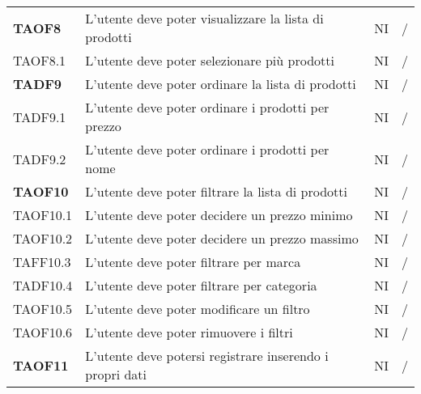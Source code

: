 \begin{center}
\begin{longtable}[!h]{p{60px} p{240px} p{35px} p{35px}}
        \textbf{TAOF8}  & L'utente deve poter visualizzare la lista di prodotti                                               & NI             & /              \\
        TAOF8.1         & L'utente deve poter selezionare più prodotti                                                        & NI             & /              \\
        \textbf{TADF9}  & L'utente deve poter ordinare la lista di prodotti                                                   & NI             & /              \\
        TADF9.1         & L'utente deve poter ordinare i prodotti per prezzo                                                  & NI             & /              \\
        TADF9.2         & L'utente deve poter ordinare i prodotti per nome                                                    & NI             & /              \\
        \textbf{TAOF10} & L'utente deve poter filtrare la lista di prodotti                                                   & NI             & /              \\
        TAOF10.1        & L'utente deve poter decidere un prezzo minimo                                                       & NI             & /              \\
        TAOF10.2        & L'utente deve poter decidere un prezzo massimo                                                      & NI             & /              \\
        TAFF10.3        & L'utente deve poter filtrare per marca                                                              & NI             & /              \\
        TADF10.4        & L'utente deve poter filtrare per categoria                                                          & NI             & /              \\
        TAOF10.5        & L'utente deve poter modificare un filtro                                                            & NI             & /              \\
        TAOF10.6        & L'utente deve poter rimuovere i filtri                                                              & NI             & /              \\
        \textbf{TAOF11} & L'utente deve potersi registrare inserendo i propri dati                                            & NI             & /              \\

\end{longtable}
\end{center}
